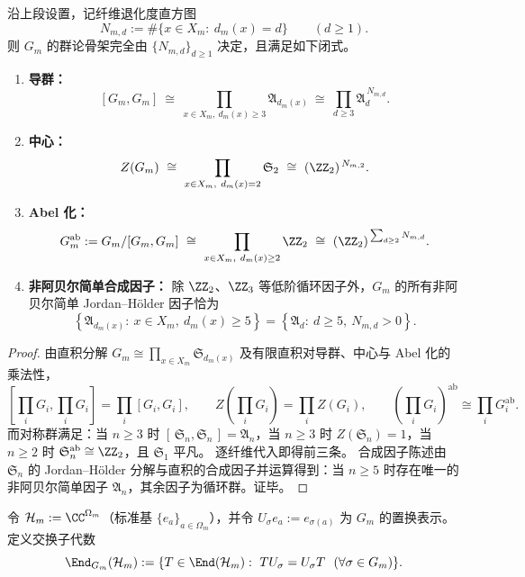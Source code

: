 \begin{proposition}\label{prop:op-algebra-fold-gauge-group-structure}
沿上段设置，记纤维退化度直方图
\[
N_{m,d}:=\#\{x\in X_m:\ d_m(x)=d\}\qquad(d\ge 1).
\]
则 \(G_m\) 的群论骨架完全由 \(\{N_{m,d}\}_{d\ge 1}\) 决定，且满足如下闭式。
\begin{enumerate}
  \item \textbf{导群：}
  \[
  [G_m,G_m]\ \cong\ \prod_{x\in X_m,\ d_m(x)\ge 3}\mathfrak{A}_{d_m(x)}
  \ \cong\ \prod_{d\ge 3}\mathfrak{A}_d^{\,N_{m,d}}.
  \]
  \item \textbf{中心：}
  \[
  Z(G_m)\ \cong\ \prod_{x\in X_m,\ d_m(x)=2}\mathfrak{S}_2
  \ \cong\ (\ZZ_2)^{\,N_{m,2}}.
  \]
  \item \textbf{Abel 化：}
  \[
  G_m^{\mathrm{ab}}
  :=G_m/[G_m,G_m]
  \ \cong\ \prod_{x\in X_m,\ d_m(x)\ge 2}\ZZ_2
  \ \cong\ (\ZZ_2)^{\,\sum_{d\ge 2}N_{m,d}}.
  \]
  \item \textbf{非阿贝尔简单合成因子：}
  除 \(\ZZ_2\)、\(\ZZ_3\) 等低阶循环因子外，\(G_m\) 的所有非阿贝尔简单 Jordan--H\"older 因子恰为
  \[
  \left\{\mathfrak{A}_{d_m(x)}:\ x\in X_m,\ d_m(x)\ge 5\right\}
  =
  \left\{\mathfrak{A}_d:\ d\ge 5,\ N_{m,d}>0\right\}.
  \]
\end{enumerate}
\end{proposition}
\begin{proof}
由直积分解 \(G_m\cong\prod_{x\in X_m}\mathfrak S_{d_m(x)}\) 及有限直积对导群、中心与 Abel 化的乘法性，
\[
[\textstyle\prod_i G_i,\prod_i G_i]=\prod_i[G_i,G_i],\qquad
Z(\textstyle\prod_i G_i)=\prod_i Z(G_i),\qquad
(\textstyle\prod_i G_i)^{\mathrm{ab}}\cong\prod_i G_i^{\mathrm{ab}}.
\]
而对称群满足：当 \(n\ge 3\) 时 \([\,\mathfrak S_n,\mathfrak S_n\,]=\mathfrak A_n\)，当 \(n\ge 3\) 时 \(Z(\mathfrak S_n)=1\)，当 \(n\ge 2\) 时 \(\mathfrak S_n^{\mathrm{ab}}\cong \ZZ_2\)，且 \(\mathfrak S_1\) 平凡。
逐纤维代入即得前三条。
合成因子陈述由 \(\mathfrak S_n\) 的 Jordan--H\"older 分解与直积的合成因子并运算得到：当 \(n\ge 5\) 时存在唯一的非阿贝尔简单因子 \(\mathfrak A_n\)，其余因子为循环群。证毕。
\end{proof}

令 \(\mathcal H_m:=\CC^{\Omega_m}\)（标准基 \(\{e_a\}_{a\in\Omega_m}\)），并令 \(U_\sigma e_a:=e_{\sigma(a)}\) 为 \(G_m\) 的置换表示。
定义交换子代数
\[
\End_{G_m}(\mathcal H_m):=\{T\in\End(\mathcal H_m):\ TU_\sigma=U_\sigma T\ \ (\forall\sigma\in G_m)\}.
\]

